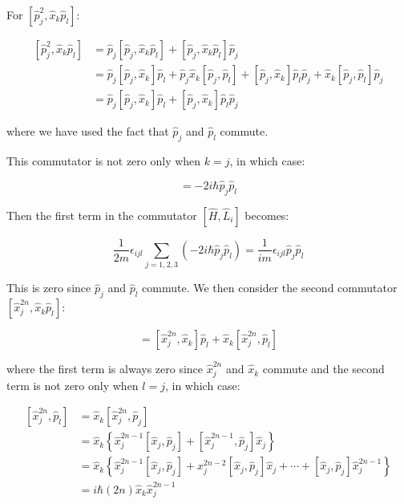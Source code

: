 \documentclass[12pt]{article}
\begin{document}
For $[\hat{p}_{j}^{2}, \hat{x}_{k} \hat{p}_{l}]$:

\begin{equation}
\begin{split}
    [\hat{p}_{j}^{2}, \hat{x}_{k} \hat{p}_{l}] &= \hat{p}_{j} [\hat{p}_{j}, \hat{x}_{k} \hat{p}_{l}] + [\hat{p}_{j}, \hat{x}_{k} \hat{p}_{l}] \hat{p}_{j} \\
    &= \hat{p}_{j} [\hat{p}_{j}, \hat{x}_{k}] \hat{p}_{l} + \hat{p}_{j} \hat{x}_{k} [\hat{p}_{j}, \hat{p}_{l}] + [\hat{p}_{j}, \hat{x}_{k}] \hat{p}_{l} \hat{p}_{j} + \hat{x}_{k} [\hat{p}_{j}, \hat{p}_{l}] \hat{p}_{j} \\
    &= \hat{p}_{j} [\hat{p}_{j}, \hat{x}_{k}] \hat{p}_{l} + [\hat{p}_{j}, \hat{x}_{k}] \hat{p}_{l} \hat{p}_{j}
\end{split}
\end{equation}

where we have used the fact that $\hat{p}_{j}$ and $\hat{p}_{l}$ commute.

This commutator is not zero only when $k = j$, in which case:

\begin{equation}
    [\hat{p}_{j}^{2}, \hat{x}_{k} \hat{p}_{l}] = -2i\hbar \hat{p}_{j} \hat{p}_{l}
\end{equation}

Then the first term in the commutator $[\hat{H}, \hat{L}_{i}]$ becomes:

\begin{equation}
    \frac{1}{2m} \epsilon_{ijl} \sum_{j = 1, 2, 3} (-2i\hbar \hat{p}_{j} \hat{p}_{l}) = \frac{1}{im} \epsilon_{ijl} \hat{p}_{j} \hat{p}_{l}
\end{equation}

This is zero since $\hat{p}_{j}$ and $\hat{p}_{l}$ commute. We then consider the second commutator $[\hat{x}_{j}^{2n}, \hat{x}_{k} \hat{p}_{l}]$:

\begin{equation}
    [\hat{x}_{j}^{2n}, \hat{x}_{k} \hat{p}_{l}] = [\hat{x}_{j}^{2n}, \hat{x}_{k}] \hat{p}_{l} + \hat{x}_{k} [\hat{x}_{j}^{2n}, \hat{p}_{l}]
\end{equation}

where the first term is always zero since $\hat{x}_{j}^{2n}$ and $\hat{x}_{k}$ commute and the second term is not zero only when $l = j$, in which case:

\begin{equation}
\begin{split}
    [\hat{x}_{j}^{2n}, \hat{p}_{l}] &= \hat{x}_{k} [\hat{x}_{j}^{2n}, \hat{p}_{j}] \\
    &= \hat{x}_{k} \left\{ \hat{x}_{j}^{2n-1} [\hat{x}_{j}, \hat{p}_{j}] + [\hat{x}_{j}^{2n-1}, \hat{p}_{j}] \hat{x}_{j} \right\} \\
    &= \hat{x}_{k} \left\{ \hat{x}_{j}^{2n-1} [\hat{x}_{j}, \hat{p}_{j}] + x_{j}^{2n-2} [\hat{x}_{j}, \hat{p}_{j}] \hat{x}_{j} + \cdots + [\hat{x}_{j}, \hat{p}_{j}] \hat{x}_{j}^{2n-1} \right\} \\
    &= i \hbar (2n) \hat{x}_{k} \hat{x}_{j}^{2n-1}
\end{split}
\end{equation}
\end{document}
